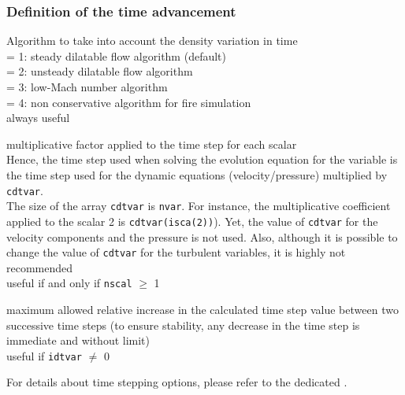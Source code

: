 \subsubsection{Definition of the time advancement}

{Algorithm to take into account the density variation in time\\
\hspace*{1.3cm}= 1: steady dilatable flow algorithm (default)\\
\hspace*{1.3cm}= 2: unsteady dilatable flow algorithm\\
\hspace*{1.3cm}= 3: low-Mach number algorithm\\
\hspace*{1.3cm}= 4: non conservative algorithm for fire simulation\\
always useful}

{multiplicative factor applied to the time step for each scalar\\
Hence, the time step used when solving the evolution equation for the
variable is the time step used for the dynamic equations (velocity/pressure)
multiplied by {\tt cdtvar}.\\
The size of the array {\tt cdtvar} is {\tt nvar}. For instance, the multiplicative
coefficient applied to the scalar 2 is {\tt cdtvar(isca(2))}). Yet, the value of
{\tt cdtvar} for the velocity components and the pressure is not used. Also,
although it is possible to change the value of {\tt cdtvar} for the turbulent
variables, it is highly not recommended\\
useful if and only if {\tt nscal} $\geqslant$ 1}

{maximum allowed relative increase in the calculated time step value
between two successive time steps (to ensure stability, any decrease in the time step
is immediate and without limit)\\
useful if {\tt idtvar} $\ne$ 0}

For details about time stepping options, please refer to the
dedicated .

